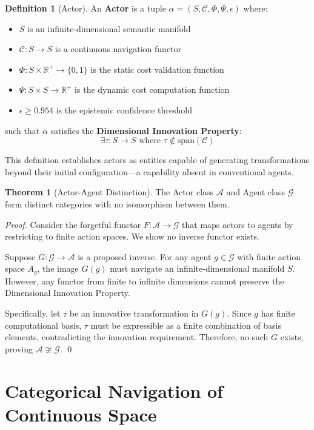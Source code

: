 \documentclass[11pt]{article}
\theoremstyle{definition}
\newtheorem{definition}{Definition}
\newtheorem{theorem}{Theorem}
\newcommand{\actors}{\mathcal{A}}
\newcommand{\agents}{\mathcal{G}}
\newcommand{\real}{\mathbb{R}}
\begin{document}
\begin{definition}[Actor]
An \textbf{Actor} is a tuple $\alpha = (S, \mathcal{C}, \Phi, \Psi, \epsilon)$ where:
\begin{itemize}
    \item $S$ is an infinite-dimensional semantic manifold
    \item $\mathcal{C}: S \to S$ is a continuous navigation functor
    \item $\Phi: S \times \real^+ \to \{0,1\}$ is the static cost validation function
    \item $\Psi: S \times S \to \real^+$ is the dynamic cost computation function
    \item $\epsilon \geq 0.954$ is the epistemic confidence threshold
\end{itemize}
such that $\alpha$ satisfies the \textbf{Dimensional Innovation Property}:
\[\exists \tau : S \to S \text{ where } \tau \notin \text{span}(\mathcal{C})\]
\end{definition}

This definition establishes actors as entities capable of generating transformations beyond their initial configuration—a capability absent in conventional agents.

\begin{theorem}[Actor-Agent Distinction]
The Actor class $\actors$ and Agent class $\agents$ form distinct categories with no isomorphism between them.
\end{theorem}

\begin{proof}
Consider the forgetful functor $F: \actors \to \agents$ that maps actors to agents by restricting to finite action spaces. We show no inverse functor exists.

Suppose $G: \agents \to \actors$ is a proposed inverse. For any agent $g \in \agents$ with finite action space $A_g$, the image $G(g)$ must navigate an infinite-dimensional manifold $S$. However, any functor from finite to infinite dimensions cannot preserve the Dimensional Innovation Property.

Specifically, let $\tau$ be an innovative transformation in $G(g)$. Since $g$ has finite computational basis, $\tau$ must be expressible as a finite combination of basis elements, contradicting the innovation requirement. Therefore, no such $G$ exists, proving $\actors \not\cong \agents$. \qed
\end{proof}

\section{Categorical Navigation of Continuous Space}
\end{document}
